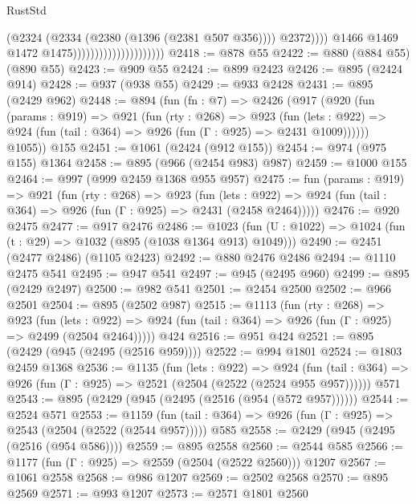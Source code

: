 \begin{lexlean}{RustStd}
\begin{coremodule}
{\begin{coremodule}
{{{{{{{{{                                                    (@2324
                                                      (@2334 (@2380 (@1396 (@2381 @507 @356))))
                                                      @2372))))
                                              @1466
                                              @1469
                                              @1472
                                              @1475)))))))))))))))))))))
@2418 := @878 @55
@2422 := @880 (@884 @55) (@890 @55)
@2423 := @909 @55
@2424 := @899 @2423
@2426 := @895 (@2424 @914)
@2428 := @937 (@938 @55)
@2429 := @933 @2428
@2431 := @895 (@2429 @962)
@2448 := @894
    (fun (fn : @7) =>
    @2426
      (@917
        (@920
          (fun (params : @919) =>
          @921
            (fun (rty : @268) =>
            @923
              (fun (lets : @922) =>
              @924 (fun (tail : @364) => @926 (fun (Γ : @925) => @2431 @1009))))))
        @1055))
    @155
@2451 := @1061 (@2424 (@912 @155))
@2454 := @974 (@975 @155) @1364
@2458 := @895 (@966 (@2454 @983) @987)
@2459 := @1000 @155
@2464 := @997 (@999 @2459 @1368 @955 @957)
@2475 := fun (params : @919) =>
  @921
    (fun (rty : @268) =>
    @923
      (fun (lets : @922) =>
      @924 (fun (tail : @364) => @926 (fun (Γ : @925) => @2431 (@2458 @2464)))))
@2476 := @920 @2475
@2477 := @917 @2476
@2486 := @1023 (fun (U : @1022) => @1024 (fun (t : @29) => @1032 (@895 (@1038 @1364 @913) @1049)))
@2490 := @2451 (@2477 @2486) (@1105 @2423)
@2492 := @880 @2476 @2486
@2494 := @1110 @2475 @541
@2495 := @947 @541
@2497 := @945 (@2495 @960)
@2499 := @895 (@2429 @2497)
@2500 := @982 @541
@2501 := @2454 @2500
@2502 := @966 @2501
@2504 := @895 (@2502 @987)
@2515 := @1113
    (fun (rty : @268) =>
    @923
      (fun (lets : @922) =>
      @924 (fun (tail : @364) => @926 (fun (Γ : @925) => @2499 (@2504 @2464)))))
    @424
@2516 := @951 @424
@2521 := @895 (@2429 (@945 (@2495 (@2516 @959))))
@2522 := @994 @1801
@2524 := @1803 @2459 @1368
@2536 := @1135
    (fun (lets : @922) =>
    @924 (fun (tail : @364) => @926 (fun (Γ : @925) => @2521 (@2504 (@2522 (@2524 @955 @957))))))
    @571
@2543 := @895 (@2429 (@945 (@2495 (@2516 (@954 (@572 @957))))))
@2544 := @2524 @571
@2553 := @1159
    (fun (tail : @364) => @926 (fun (Γ : @925) => @2543 (@2504 (@2522 (@2544 @957)))))
    @585
@2558 := @2429 (@945 (@2495 (@2516 (@954 @586))))
@2559 := @895 @2558
@2560 := @2544 @585
@2566 := @1177 (fun (Γ : @925) => @2559 (@2504 (@2522 @2560))) @1207
@2567 := @1061 @2558
@2568 := @986 @1207
@2569 := @2502 @2568
@2570 := @895 @2569
@2571 := @993 @1207
@2573 := @2571 @1801 @2560
}}}}}}}}}
\end{coremodule}}
\end{coremodule}
\end{lexlean}
